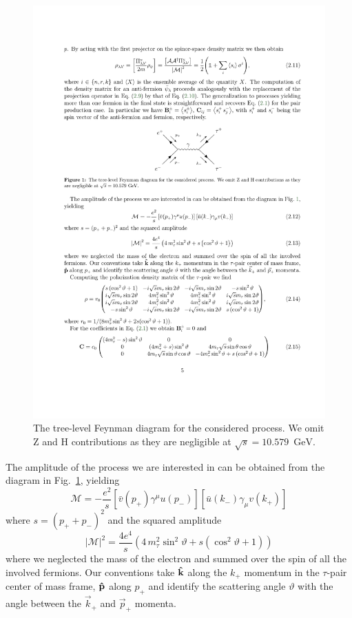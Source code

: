 \documentclass[a4paper,12pt,twocolumn]{article}
\numberwithin{equation}{section} %
\def\abs#1{\left| #1\right|}
\newcommand{\hk}{{\bf \hat{k}}}
\newcommand{\hp}{{\bf \hat{p}}}
\newcommand{\Pgt}{\ensuremath{\tau}\xspace}
\newcommand{\PH}{\ensuremath{\textrm{H}}\xspace}
\newcommand{\PZ}{\ensuremath{\textrm{Z}}\xspace}
\newcommand{\GeV}{\ensuremath{\textrm{GeV}}\xspace}
\begin{document}
\begin{figure}[h]
\centering
\includegraphics[scale=1]{diagram.pdf}
\caption{The tree-level Feynman diagram for the considered process. We omit $\PZ$ and $\PH$ contributions as they are negligible at $\sqrt{s} = 10.579$~\GeV. }
\label{fig:diag}
\end{figure}

The amplitude of the process we are interested in can be obtained from the diagram in Fig.~\ref{fig:diag}, yielding 
\begin{equation}
\mathcal{M}=
-\frac{e^2}{s} \left[\bar{v}(p_+)\gamma^\mu u(p_-)\right]\left[ \bar u(k_-)\gamma_\mu v(k_+)\right]
\end{equation}
where $s=(p_+ + p_-)^2$ and the squared amplitude 
\begin{equation}
    \abs{\mathcal{M}}^2=\frac{4 e^4}{s}  \left(4 \, m_{\Pgt}^2\sin^2\vartheta + s\left(\cos^2\vartheta + 1\right) \right)
\end{equation}
where we neglected the mass of the electron and summed over the spin of all the involved fermions. Our conventions take $\hk$ along the $k_+$ momentum in the $\tau$-pair center of mass frame, $\hp$ along $p_+$ and identify the scattering angle $\vartheta$ with the angle between the $\vec{k}_+$ and $\vec{p}_+$ momenta. 
\end{document}
